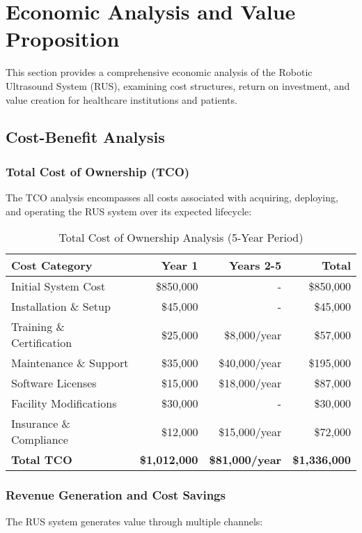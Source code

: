 \section{Economic Analysis and Value Proposition}
\label{sec:economic-analysis}

This section provides a comprehensive economic analysis of the Robotic Ultrasound System (RUS), examining cost structures, return on investment, and value creation for healthcare institutions and patients.

\subsection{Cost-Benefit Analysis}

\subsubsection{Total Cost of Ownership (TCO)}
The TCO analysis encompasses all costs associated with acquiring, deploying, and operating the RUS system over its expected lifecycle:

\begin{table}[htbp]
\centering
\caption{Total Cost of Ownership Analysis (5-Year Period)}
\label{tab:tco-analysis}
\begin{tabular}{|l|r|r|r|}
\hline
\textbf{Cost Category} & \textbf{Year 1} & \textbf{Years 2-5} & \textbf{Total} \\
\hline
Initial System Cost & \$850,000 & - & \$850,000 \\
Installation \& Setup & \$45,000 & - & \$45,000 \\
Training \& Certification & \$25,000 & \$8,000/year & \$57,000 \\
Maintenance \& Support & \$35,000 & \$40,000/year & \$195,000 \\
Software Licenses & \$15,000 & \$18,000/year & \$87,000 \\
Facility Modifications & \$30,000 & - & \$30,000 \\
Insurance \& Compliance & \$12,000 & \$15,000/year & \$72,000 \\
\hline
\textbf{Total TCO} & \textbf{\$1,012,000} & \textbf{\$81,000/year} & \textbf{\$1,336,000} \\
\hline
\end{tabular}
\end{table}

\subsubsection{Revenue Generation and Cost Savings}
The RUS system generates value through multiple channels:

